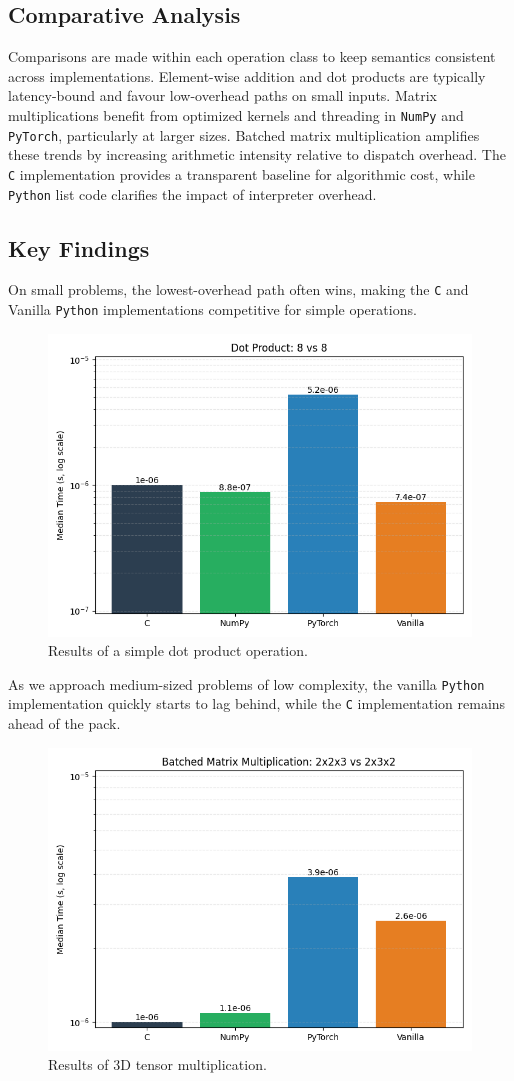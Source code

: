 \documentclass[a4paper,12pt]{article}
\begin{document}
\subsection{Comparative Analysis}
Comparisons are made within each operation class to keep semantics consistent across implementations. Element-wise addition and dot products are typically latency-bound and favour low-overhead paths on small inputs. Matrix multiplications benefit from optimized kernels and threading in \texttt{NumPy} and \texttt{PyTorch}, particularly at larger sizes. Batched matrix multiplication amplifies these trends by increasing arithmetic intensity relative to dispatch overhead. The \texttt{C} implementation provides a transparent baseline for algorithmic cost, while \texttt{Python} list code clarifies the impact of interpreter overhead.

\subsection{Key Findings}
On small problems, the lowest-overhead path often wins, making the \texttt{C} and Vanilla \texttt{Python} implementations competitive for simple operations. 

\begin{figure}[H]
  \centering
  \includegraphics[width=0.7\linewidth]{results/bar/DOT_8_8.png}
  \caption{Results of a simple dot product operation.}
  \label{fig:one}
\end{figure}

As we approach medium-sized problems of low complexity, the vanilla \texttt{Python} implementation quickly starts to lag behind, while the \texttt{C} implementation remains ahead of the pack.

\begin{figure}[H]
  \centering
  \includegraphics[width=0.7\linewidth]{results/bar/BMM_2x2x3_2x3x2.png}
  \caption{Results of 3D tensor multiplication.}
  \label{fig:two}
\end{figure}
\end{document}
